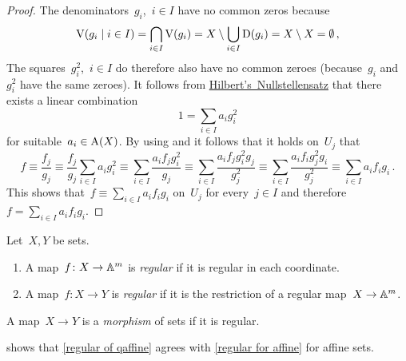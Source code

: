 \begin{proof}
  The denominators~$g_i$,~$i \in I$ have no common zeros because
  \[
              \vset(g_i \suchthat i \in I)
    =         \bigcap_{i \in I} \vset(g_i)
    =         X \setminus \bigcup_{i \in I} \Dopen(g_i)
    =         X \setminus X
    =         \emptyset \,,
  \]
  The squares~$g_i^2$,~$i \in I$ do therefore also have no common zeroes (because~$g_i$ and~$g_i^2$ have the same zeroes).
  It follows from \hyperref[nullstellensatz 2]{Hilbert’s~Nullstellensatz} that there exists a linear combination
  \begin{equation}
  \label{unit as linear combination}
      1
    = \sum_{i \in I} a_i g_i^2
  \end{equation}
  for suitable~$a_i \in \operatorname{A}(X)$.
  By using  and  it follows that it holds on~$U_j$ that
  \[
            f
    \equiv  \frac{f_j}{g_j}
    \equiv  \frac{f_j}{g_j} \sum_{i \in I} a_i g_i^2
    \equiv  \sum_{i \in I} \frac{a_i f_j g_i^2}{g_j}
    \equiv  \sum_{i \in I} \frac{a_i f_j g_i^2 g_j}{g_j^2}
    \equiv  \sum_{i \in I} \frac{a_i f_i g_j^2 g_i}{g_j^2}
    \equiv  \sum_{i \in I} a_i f_i g_i \,.
  \]
  This shows that~$f \equiv \sum_{i \in I} a_i f_i g_i$ on~$U_j$ for every~$j \in I$ and therefore~$f = \sum_{i \in I} a_i f_i g_i$.
\end{proof}




\begin{definition}
  \label{regular of qaffine}
  Let~$X,Y$ be {\qaffine} sets.
  \begin{enumerate}[resume]
    \item
      A map~$f \colon X \to \mathbb{A}^m$ is \emph{regular} if it is regular in each coordinate.
    \item
      A map~$f \colon X \to Y$ is \emph{regular} if it is the restriction of a regular map~$X \to \mathbb{A}^m$.
  \end{enumerate}
  A map~$X \to Y$ is a \emph{morphism} of {\qaffine} sets if it is regular.
\end{definition}


\begin{remark}
   shows that \cref{regular of qaffine} agrees with \cref{regular for affine} for affine sets.
\end{remark}


